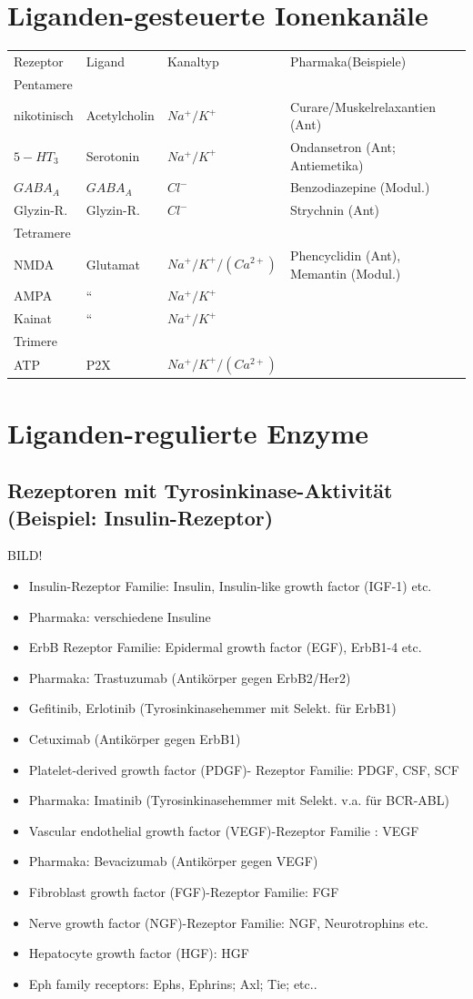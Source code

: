 \documentclass[10pt,a4paper]{report}
\begin{document}
\section{Liganden-gesteuerte Ionenkanäle}
\begin{tabularx}{\textwidth}{XXXX}
Rezeptor&Ligand&Kanaltyp&Pharmaka(Beispiele)\\
Pentamere&&&\\
nikotinisch&Acetylcholin&$Na^+/ K^+$&Curare/Muskelrelaxantien (Ant)\\
$5-HT_3$&Serotonin&$Na^+/ K^+$&Ondansetron (Ant; Antiemetika)\\
$GABA_A$&$GABA_A$&$Cl^-$&Benzodiazepine (Modul.)\\
Glyzin-R.&Glyzin-R.&$Cl^-$&Strychnin (Ant)\\
Tetramere&&&\\
NMDA&Glutamat&$Na^+/ K^+/ (Ca^{2+})$&Phencyclidin (Ant), Memantin (Modul.)\\
AMPA&“&$Na^+/ K^+$&\\
Kainat&“&$Na^+/K^+$&\\
Trimere&&&\\
ATP&P2X&$Na^+/ K^+/ (Ca^{2+})$&\\
\end{tabularx}
\section{Liganden-regulierte Enzyme}
\subsection{Rezeptoren mit Tyrosinkinase-Aktivität (Beispiel: Insulin-Rezeptor)}
BILD!
\begin{itemize}
	\item Insulin-Rezeptor Familie:  Insulin, Insulin-like growth factor (IGF-1) etc.
	\item Pharmaka: verschiedene Insuline
	\item ErbB Rezeptor Familie: Epidermal growth factor (EGF), ErbB1-4 etc.
	\item Pharmaka: Trastuzumab (Antikörper gegen ErbB2/Her2)
	\item Gefitinib, Erlotinib (Tyrosinkinasehemmer mit Selekt. für ErbB1)
	\item Cetuximab (Antikörper gegen ErbB1)
	\item Platelet-derived growth factor (PDGF)- Rezeptor Familie: PDGF, CSF, SCF
	\item Pharmaka: Imatinib (Tyrosinkinasehemmer mit Selekt. v.a. für BCR-ABL) 
	\item Vascular endothelial growth factor (VEGF)-Rezeptor Familie : VEGF
	\item Pharmaka: Bevacizumab (Antikörper gegen VEGF)
	\item Fibroblast growth factor (FGF)-Rezeptor Familie: FGF 
	\item Nerve growth factor (NGF)-Rezeptor Familie: NGF, Neurotrophins etc.
	\item Hepatocyte growth factor (HGF): HGF 
	\item Eph family receptors: Ephs, Ephrins;   Axl; Tie; etc..
\end{itemize}
\end{document}
